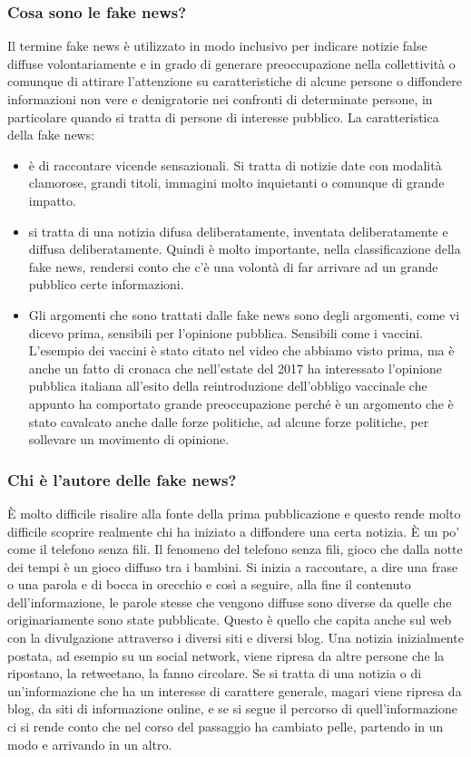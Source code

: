 \subsubsection{Cosa sono le fake news?}
Il termine fake news è utilizzato in modo inclusivo per indicare notizie false diffuse volontariamente e in grado di generare preoccupazione nella collettività o comunque di attirare l'attenzione su caratteristiche di alcune persone o diffondere informazioni non vere e denigratorie nei confronti di determinate persone, in particolare quando si tratta di persone di interesse pubblico.
La caratteristica della fake news:
\begin{itemize}
    \item è di raccontare vicende sensazionali. Si tratta di notizie date con modalità clamorose, grandi titoli, immagini molto inquietanti o comunque di grande impatto. 
    \item si tratta di una notizia difusa deliberatamente, inventata deliberatamente e diffusa deliberatamente. Quindi è molto importante, nella classificazione della fake news, rendersi conto che c'è una volontà di far arrivare ad un grande pubblico certe informazioni.
    \item Gli argomenti che sono trattati dalle fake news sono degli argomenti, come vi dicevo prima, sensibili per l'opinione pubblica. Sensibili come i vaccini. L'esempio dei vaccini è stato citato nel video che abbiamo visto prima, ma è anche un fatto di cronaca che nell'estate del 2017 ha interessato l'opinione pubblica italiana all'esito della reintroduzione dell'obbligo vaccinale che appunto ha comportato grande preoccupazione perché è un argomento che è stato cavalcato anche dalle forze politiche, ad alcune forze politiche, per sollevare un movimento di opinione.
\end{itemize}

\subsubsection{Chi è l'autore delle fake news?}
È molto difficile risalire alla fonte della prima pubblicazione e questo rende molto difficile scoprire realmente chi ha iniziato a diffondere una certa notizia. È un po' come il telefono senza fili. Il fenomeno del telefono senza fili, gioco che dalla notte dei tempi è un gioco diffuso tra i bambini. Si inizia a raccontare, a dire una frase o una parola e di bocca in orecchio e così a seguire, alla fine il contenuto dell'informazione, le parole stesse che vengono diffuse sono diverse da quelle che originariamente sono state pubblicate. Questo è quello che capita anche sul web con la divulgazione attraverso i diversi siti e diversi blog. Una notizia inizialmente postata, ad esempio su un social network, viene ripresa da altre persone che la ripostano, la retweetano, la fanno circolare. Se si tratta di una notizia o di un'informazione che ha un interesse di carattere generale, magari viene ripresa da blog, da siti di informazione online, e se si segue il percorso di quell'informazione ci si rende conto che nel corso del passaggio ha cambiato pelle, partendo in un modo e arrivando in un altro.

